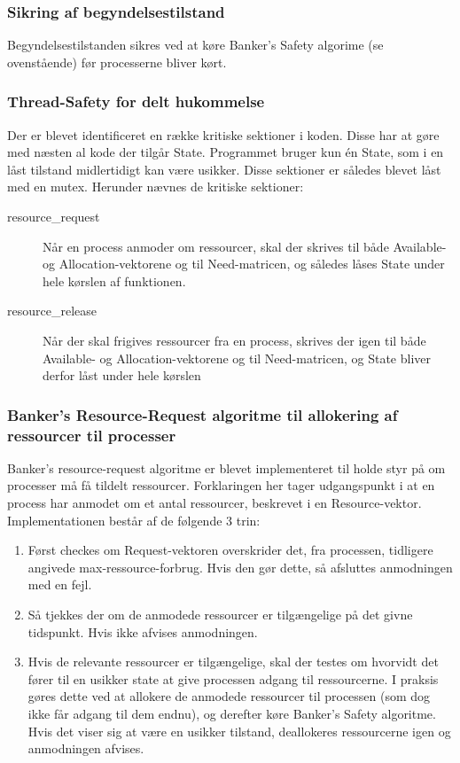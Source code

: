 \subsubsection*{Sikring af begyndelsestilstand}
Begyndelsestilstanden sikres ved at køre Banker's Safety algorime (se ovenstående) før processerne bliver kørt.

\subsubsection*{Thread-Safety for delt hukommelse}
Der er blevet identificeret en række kritiske sektioner i koden. Disse har at gøre med næsten al kode der tilgår State. Programmet bruger kun én State, som i en låst tilstand midlertidigt kan være usikker. Disse sektioner er således blevet låst med en mutex. Herunder nævnes de kritiske sektioner:
\begin{description}
	\item[resource\_request] Når en process anmoder om ressourcer, skal der skrives til både Available- og Allocation-vektorene og til Need-matricen, og således låses State under hele kørslen af funktionen.

	\item[resource\_release] Når der skal frigives ressourcer fra en process, skrives der igen til både Available- og Allocation-vektorene og til Need-matricen, og State bliver derfor låst under hele kørslen
\end{description}

\subsubsection*{Banker's Resource-Request algoritme til allokering af ressourcer til processer}
Banker's resource-request algoritme er blevet implementeret til holde styr på om processer må få tildelt ressourcer. Forklaringen her tager udgangspunkt i at en process har anmodet om et antal ressourcer, beskrevet i en Resource-vektor. Implementationen består af de følgende 3 trin:
\begin{enumerate}
	\item Først checkes om Request-vektoren overskrider det, fra processen, tidligere angivede max-ressource-forbrug. Hvis den gør dette, så afsluttes anmodningen med en fejl.
	\item Så tjekkes der om de anmodede ressourcer er tilgængelige på det givne tidspunkt. Hvis ikke afvises anmodningen.
	\item Hvis de relevante ressourcer er tilgængelige, skal der testes om hvorvidt det fører til en usikker state at give processen adgang til ressourcerne. I praksis gøres dette ved at allokere de anmodede ressourcer til processen (som dog ikke får adgang til dem endnu), og derefter køre Banker's Safety algoritme. Hvis det viser sig at være en usikker tilstand, deallokeres ressourcerne igen og anmodningen afvises. 
\end{enumerate}




